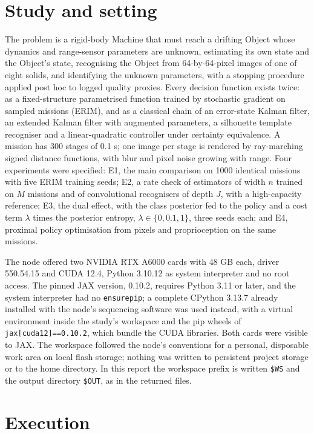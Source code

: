 \documentclass[11pt,a4paper]{article}
\begin{document}
\section{Study and setting}

The problem is a rigid-body Machine that must reach a drifting Object whose dynamics and range-sensor parameters are unknown, estimating its own state and the Object's state, recognising the Object from 64-by-64-pixel images of one of eight solids, and identifying the unknown parameters, with a stopping procedure applied post hoc to logged quality proxies. Every decision function exists twice: as a fixed-structure parametrised function trained by stochastic gradient on sampled missions (ERIM), and as a classical chain of an error-state Kalman filter, an extended Kalman filter with augmented parameters, a silhouette template recogniser and a linear-quadratic controller under certainty equivalence. A mission has 300 stages of 0.1 s; one image per stage is rendered by ray-marching signed distance functions, with blur and pixel noise growing with range. Four experiments were specified: E1, the main comparison on 1000 identical missions with five ERIM training seeds; E2, a rate check of estimators of width $n$ trained on $M$ missions and of convolutional recognisers of depth $J$, with a high-capacity reference; E3, the dual effect, with the class posterior fed to the policy and a cost term $\lambda$ times the posterior entropy, $\lambda \in \{0, 0.1, 1\}$, three seeds each; and E4, proximal policy optimisation from pixels and proprioception on the same missions.

The node offered two NVIDIA RTX A6000 cards with 48 GB each, driver 550.54.15 and CUDA 12.4, Python 3.10.12 as system interpreter and no root access. The pinned JAX version, 0.10.2, requires Python 3.11 or later, and the system interpreter had no \texttt{ensurepip}; a complete CPython 3.13.7 already installed with the node's sequencing software was used instead, with a virtual environment inside the study's workspace and the pip wheels of \texttt{jax[cuda12]==0.10.2}, which bundle the CUDA libraries. Both cards were visible to JAX. The workspace followed the node's conventions for a personal, disposable work area on local flash storage; nothing was written to persistent project storage or to the home directory. In this report the workspace prefix is written \texttt{\$WS} and the output directory \texttt{\$OUT}, as in the returned files.

\section{Execution}
\end{document}
